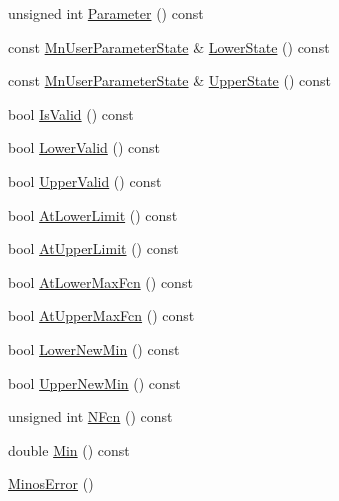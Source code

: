 \begin{DoxyCompactItemize}
unsigned int \mbox{\hyperlink{classROOT_1_1Minuit2_1_1MinosError_a5d4ac177a8075a3698dbecac3a8c552b}{Parameter}} () const
\item 
const \mbox{\hyperlink{classROOT_1_1Minuit2_1_1MnUserParameterState}{Mn\+User\+Parameter\+State}} \& \mbox{\hyperlink{classROOT_1_1Minuit2_1_1MinosError_ac10a407a1cb13f4e0c1b4d21383d15df}{Lower\+State}} () const
\item 
const \mbox{\hyperlink{classROOT_1_1Minuit2_1_1MnUserParameterState}{Mn\+User\+Parameter\+State}} \& \mbox{\hyperlink{classROOT_1_1Minuit2_1_1MinosError_a89164c38dd7596c3164f1083eb9aac72}{Upper\+State}} () const
\item 
bool \mbox{\hyperlink{classROOT_1_1Minuit2_1_1MinosError_af6b7accfe397a06417ecc1f989d82e00}{Is\+Valid}} () const
\item 
bool \mbox{\hyperlink{classROOT_1_1Minuit2_1_1MinosError_a4b8c37c90bb53d98d3b4364a5ebc2228}{Lower\+Valid}} () const
\item 
bool \mbox{\hyperlink{classROOT_1_1Minuit2_1_1MinosError_a4180ae7ff87d9a2c0942c8e6ac81a8c0}{Upper\+Valid}} () const
\item 
bool \mbox{\hyperlink{classROOT_1_1Minuit2_1_1MinosError_ab5bac1c70b34e42714730cad95978b51}{At\+Lower\+Limit}} () const
\item 
bool \mbox{\hyperlink{classROOT_1_1Minuit2_1_1MinosError_a6c8a60e5b855f9d7164f441ea69c75eb}{At\+Upper\+Limit}} () const
\item 
bool \mbox{\hyperlink{classROOT_1_1Minuit2_1_1MinosError_a6ec22eac3b7dd1a281f1df710ed1dc74}{At\+Lower\+Max\+Fcn}} () const
\item 
bool \mbox{\hyperlink{classROOT_1_1Minuit2_1_1MinosError_a940c974f6ac87d22c4d340ef2fc88e8c}{At\+Upper\+Max\+Fcn}} () const
\item 
bool \mbox{\hyperlink{classROOT_1_1Minuit2_1_1MinosError_a9a806056992d1acb26420bf4895b46e9}{Lower\+New\+Min}} () const
\item 
bool \mbox{\hyperlink{classROOT_1_1Minuit2_1_1MinosError_a5f37bb106903e148029b8461f9bbbe25}{Upper\+New\+Min}} () const
\item 
unsigned int \mbox{\hyperlink{classROOT_1_1Minuit2_1_1MinosError_a4956b01f7899f42847617c378e5c86c2}{N\+Fcn}} () const
\item 
double \mbox{\hyperlink{classROOT_1_1Minuit2_1_1MinosError_a109ad5c9e19a97bda32f506718eaef02}{Min}} () const
\item 
\mbox{\hyperlink{classROOT_1_1Minuit2_1_1MinosError_a5cb0fad5d73d20905a57fb1c505c9fd2}{Minos\+Error}} ()

\end{DoxyCompactItemize}
